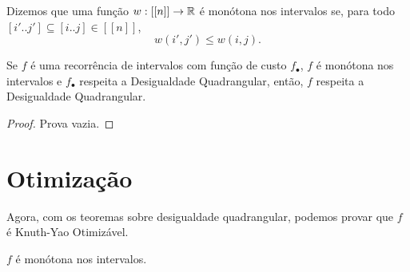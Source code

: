 \begin{defi} \label{mon_int}
Dizemos que uma função $w : [[n]] \to \mathbb{R}$ é monótona nos intervalos se, para todo $[i'..j'] \subseteq [i..j] \in [[n]]$,
$$ w(i',j') \leq w(i,j). $$
\end{defi}

\begin{theo} \label{qi_cost_to_rec}
Se $f$ é uma recorrência de intervalos com função de custo $f_\bullet$, $f$ é monótona nos intervalos e $f_\bullet$ respeita a Desigualdade Quadrangular, então, $f$ respeita a Desigualdade Quadrangular.
\end{theo}

\begin{proof}
Prova vazia.
\end{proof}


\section{Otimização}

Agora, com os teoremas sobre desigualdade quadrangular, podemos provar que $f$ é Knuth-Yao Otimizável.

\begin{prop}
$f$ é monótona nos intervalos.
\end{prop}

